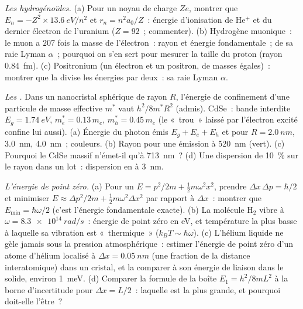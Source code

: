 \begin{exercise}[$\star\star\star$]\label{exo:b1:quantum-introduction:10}
\emph{Les hydrogénoïdes.} (a) Pour un noyau de charge $Ze$, montrer que
$E_n = -Z^2 \times \qty{13.6}{eV}/n^2$ et $r_n = n^2a_0/Z$~: énergie
d'ionisation de He$^+$ et du dernier électron de l'uranium ($Z = 92$~; commenter).
(b) Hydrogène muonique~: le muon a $207$ fois la masse de l'électron~:
rayon et énergie fondamentale~;  de sa raie Lyman $\alpha$~;
pourquoi on s'en sert pour mesurer la taille du proton (rayon \qty{0.84}{fm}).
(c) Positronium (un électron et un positron, de masses égales)~: montrer que
la  divise les énergies par deux~: sa raie Lyman $\alpha$.
\end{exercise}

\begin{exercise}[$\star\star\star$]\label{exo:b1:quantum-introduction:11}
\emph{Les .} Dans un nanocristal sphérique de rayon $R$,
l'énergie de confinement d'une particule de masse effective $m^\ast$ vaut
$h^2/8m^\ast R^2$ (admis). CdSe~: bande interdite $E_g = \qty{1.74}{eV}$, $m_e^\ast =
0.13\,m_e$, $m_h^\ast = 0.45\,m_e$ (le «~trou~» laissé par l'électron
excité confine lui aussi). (a) Énergie du photon émis $E_g + E_e + E_h$
et  pour $R = \qty{2.0}{nm}$, \qty{3.0}{nm}, \qty{4.0}{nm}~; couleurs.
(b) Rayon pour une émission à \qty{520}{nm} (vert). (c) Pourquoi le CdSe
massif n'émet-il qu'à \qty{713}{nm}~? (d) Une dispersion de \qty{10}{\percent} sur
le rayon dans un lot~: dispersion en  à \qty{3}{nm}.
\end{exercise}

\begin{exercise}[$\star\star\star$]\label{exo:b1:quantum-introduction:12}
\emph{L'énergie de point zéro.} (a) Pour un  $E = p^2/2m +
\tfrac12m\omega^2x^2$, prendre $\Delta x\,\Delta p = \hbar/2$ et minimiser $E \approx
\Delta p^2/2m + \tfrac12m\omega^2\Delta x^2$ par rapport à $\Delta x$~: montrer que $E_{\min} = \hbar\omega/2$
(c'est l'énergie fondamentale exacte). (b) La molécule H$_2$ vibre à $\omega =
\qty{8.3e14}{rad/s}$~: énergie de point zéro en eV, et température la plus
basse à laquelle sa vibration est «~thermique~» ($k_BT \sim \hbar\omega$).
(c) L'hélium liquide ne gèle jamais sous la pression atmosphérique~: estimer
l'énergie de point zéro d'un atome d'hélium localisé à $\Delta x = \qty{0.05}{nm}$
(une fraction de la distance interatomique) dans un cristal, et la comparer à
son énergie de liaison dans le solide, environ \qty{1}{meV}. (d) Comparer la formule de la boîte $E_1 = h^2/8mL^2$ à la
borne d'incertitude pour $\Delta x = L/2$~: laquelle est la plus grande, et pourquoi doit-elle l'être~?
\end{exercise}

